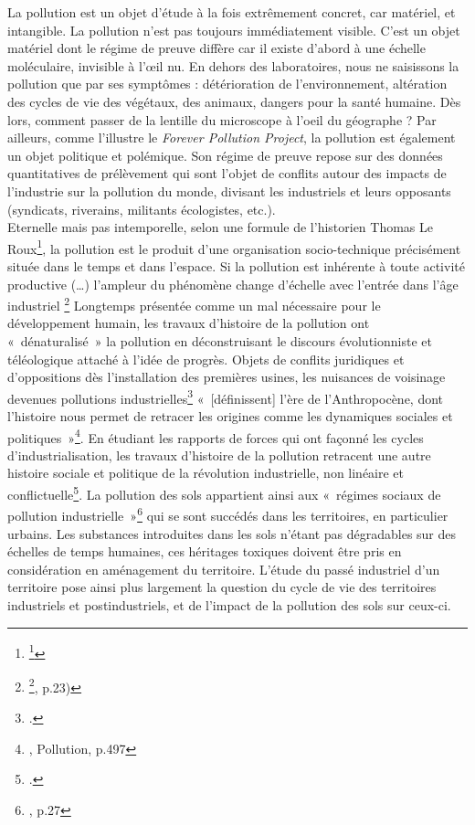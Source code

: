 \documentclass[a4paper,twoside,12pt]{book}
\begin{document}
La pollution est un objet d'étude à la fois extrêmement concret, car matériel, et intangible. La pollution n'est pas toujours immédiatement visible. C'est un objet matériel dont le régime de preuve diffère car il existe d'abord à une échelle moléculaire, invisible à l’\oe{}il nu. En dehors des laboratoires, nous ne saisissons la pollution que par ses symptômes : détérioration de l'environnement, altération des cycles de vie des végétaux, des animaux, dangers pour la santé humaine. Dès lors, comment passer de la lentille du microscope à l'oeil du géographe ? Par ailleurs, comme l'illustre le \textit{Forever Pollution Project}, la pollution est également un objet politique et polémique. Son régime de preuve repose sur des données quantitatives de prélèvement qui sont l'objet de conflits autour des impacts de l'industrie sur la pollution du monde, divisant les industriels et leurs opposants (syndicats, riverains, militants écologistes, etc.). \\

Eternelle mais pas intemporelle, selon une formule de l'historien Thomas Le Roux\footnote{\footcite{le_roux_polluants_2023}}, la pollution est le produit d’une organisation socio-technique précisément située dans le temps et dans l’espace. \og{} Si la pollution est inhérente à toute activité productive (…) l’ampleur du phénomène change d’échelle avec l’entrée dans l’âge industriel \fg{}\footnote{\footcite{jarrige_contamination_2017}, p.23)} Longtemps présentée comme un mal nécessaire pour le développement humain, les travaux d’histoire de la pollution ont « dénaturalisé » la pollution en déconstruisant le discours évolutionniste et téléologique attaché à l’idée de progrès. Objets de conflits juridiques et d’oppositions dès l’installation des premières usines, les nuisances de voisinage devenues pollutions industrielles\footcite{bernhardt_demon_2002} « [définissent] l’ère de l’Anthropocène, dont l’histoire nous permet de retracer les origines comme les dynamiques sociales et politiques »\footnote{\cite{collectif_dictionnaire_2024}, \og{}Pollution\fg{}, p.497}. En étudiant les rapports de forces qui ont façonné les cycles d’industrialisation, les travaux d’histoire de la pollution retracent une autre histoire sociale et politique de la révolution industrielle, non linéaire et conflictuelle\footcite{lette_debordements_2013}. La pollution des sols appartient ainsi aux « régimes sociaux de pollution industrielle »\footnote{\cite{jarrige_contamination_2017}, p.27} qui se sont succédés dans les territoires, en particulier urbains. Les substances introduites dans les sols n’étant pas dégradables sur des échelles de temps humaines, ces héritages toxiques doivent être pris en considération en aménagement du territoire. L’étude du passé industriel d’un territoire pose ainsi plus largement la question du cycle de vie des territoires industriels et postindustriels, et de l’impact de la pollution des sols sur ceux-ci. \\
\end{document}
